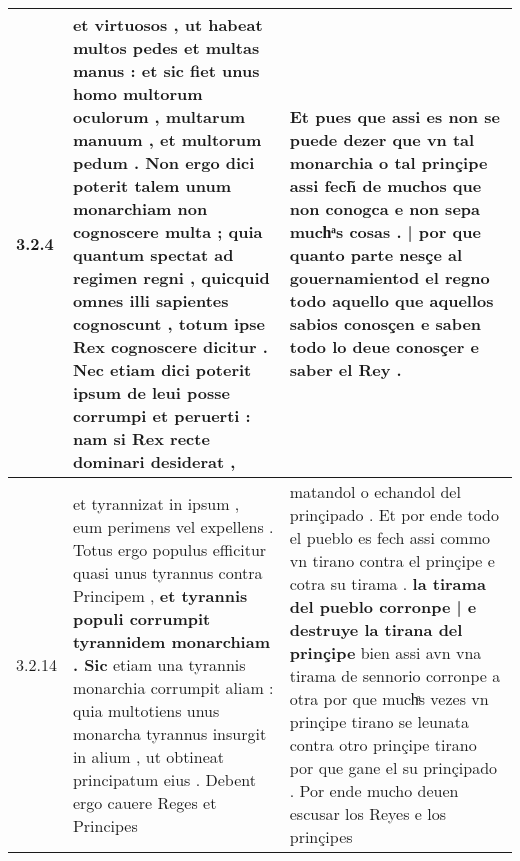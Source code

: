 \begin{tabular}{|p{1cm}|p{6.5cm}|p{6.5cm}|}

\hline
3.2.4 & et virtuosos , ut habeat multos pedes et multas manus : et sic fiet unus homo multorum oculorum , multarum manuum , \textbf{ et multorum pedum . Non ergo dici poterit talem unum monarchiam non cognoscere multa ; } quia quantum spectat ad regimen regni , quicquid omnes illi sapientes cognoscunt , totum ipse Rex cognoscere dicitur . Nec etiam dici poterit ipsum de leui posse corrumpi et peruerti : nam si Rex recte dominari desiderat , & Et pues que assi es non se puede dezer que vn tal monarchia o tal prinçipe assi fech̃ de muchos que non conogca \textbf{ e non sepa muchͣs cosas . | por que quanto parte nesçe al gouernamientod el regno } todo aquello que aquellos sabios conosçen e saben todo lo deue conosçer e saber el Rey . \\\hline
3.2.14 & et tyrannizat in ipsum , eum perimens vel expellens . Totus ergo populus efficitur quasi unus tyrannus contra Principem , \textbf{ et tyrannis populi corrumpit tyrannidem monarchiam . Sic } etiam una tyrannis monarchia corrumpit aliam : quia multotiens unus monarcha tyrannus insurgit in alium , ut obtineat principatum eius . Debent ergo cauere Reges et Principes & matandol o echandol del prinçipado . Et por ende todo el pueblo es fech assi commo vn tirano contra el prinçipe e cotra su tirama . \textbf{ la tirama del pueblo corronpe | e destruye la tirana del prinçipe } bien assi avn vna tirama de sennorio corronpe a otra por que muchͣs vezes vn prinçipe tirano se leunata contra otro prinçipe tirano por que gane el su prinçipado . Por ende mucho deuen escusar los Reyes e los prinçipes \\\hline

\end{tabular}
